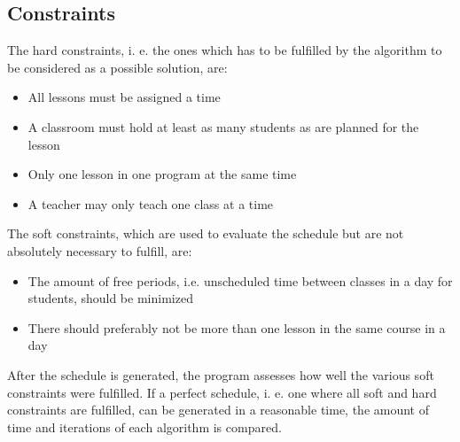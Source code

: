 \documentclass[titlepage,a4paper]{article}
\begin{document}
\subsection{Constraints}
The hard constraints, i. e. the ones which has to be fulfilled by the algorithm to be considered as a possible solution, are:
\begin{itemize}
  \item All lessons must be assigned a time
  \item A classroom must hold at least as many students as are planned for the lesson
  \item Only one lesson in one program at the same time
  \item A teacher may only teach one class at a time
\end{itemize} 
\medskip
The soft constraints, which are used to evaluate the schedule but are not absolutely necessary to fulfill, are:
\begin{itemize}
  \item The amount of free periods, i.e. unscheduled time between classes in a day for students, should be minimized
  \item There should preferably not be more than one lesson in the same course in a day
\end{itemize}
\medskip
After the schedule is generated, the program assesses how well the various soft constraints were fulfilled. If a perfect schedule, i. e. one where all soft and hard constraints are fulfilled, can be generated in a reasonable time, the amount of time and iterations of each algorithm is compared. \\\\
\end{document}
